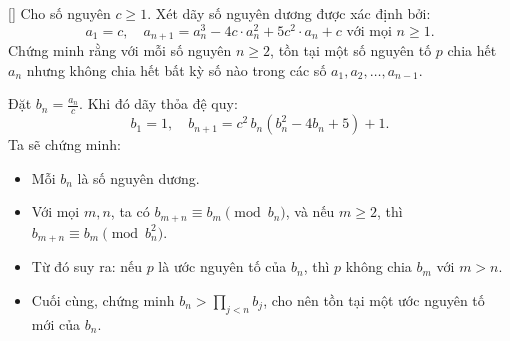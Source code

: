 \documentclass[../06-largest-exponent.tex]{subfiles}
\begin{document}
\begin{example*}\label{example:TWN-2015-TST3-D1-P3}[\textbf{}]
    \footnotemark Cho số nguyên \( c \geq 1 \). Xét dãy số nguyên dương được xác định bởi:
    \[
        a_1 = c,\quad a_{n+1} = a_n^3 - 4c \cdot a_n^2 + 5c^2 \cdot a_n + c \text{ với mọi } n \ge 1.
    \]
    Chứng minh rằng với mỗi số nguyên \( n \ge 2 \), tồn tại một số nguyên tố \( p \) chia hết \( a_n \)
    nhưng không chia hết bất kỳ số nào trong các số \( a_1, a_2, \dotsc, a_{n-1} \).
\end{example*}

\begin{story*}
    Đặt \(b_n = \tfrac{a_n}{c}\). Khi đó dãy thỏa đệ quy: 
    \[
        b_1 = 1,\quad b_{n+1} = c^2\,b_n(b_n^2 - 4b_n + 5) + 1.
    \]
    Ta sẽ chứng minh:
    \begin{itemize}[topsep=0pt, partopsep=0pt, itemsep=0pt]
        \item Mỗi \(b_n\) là số nguyên dương.
        \item Với mọi \(m, n\), ta có \(b_{m+n} \equiv b_m \pmod{b_n}\), và nếu \(m \ge 2\), thì \(b_{m+n} \equiv b_m \pmod{b_n^2}\).
        \item Từ đó suy ra: nếu \(p\) là ước nguyên tố của \(b_n\), thì \(p\) không chia \(b_m\) với \(m > n\).
        \item Cuối cùng, chứng minh \(b_n > \prod_{j < n} b_j\), cho nên tồn tại một ước nguyên tố mới của \(b_n\).
    \end{itemize}
\end{story*}

\bigbreak
\end{document}
